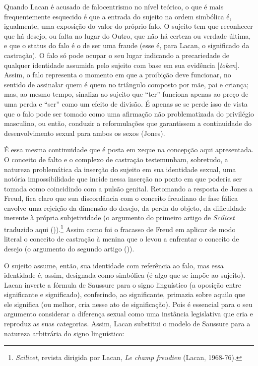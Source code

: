 Quando Lacan é acusado de falocentrismo no nível teórico, o que é mais
frequentemente esquecido é que a entrada do sujeito na ordem simbólica
é, igualmente, uma exposição do valor do próprio falo. O sujeito tem que
reconhecer que há desejo, ou falta no lugar do Outro, que não há certeza
ou verdade última, e que o status do falo é o de ser uma fraude (esse é,
para Lacan, o significado da castração). O falo só pode ocupar o seu
lugar indicando a precariedade de qualquer identidade assumida pelo
sujeito com base em sua evidência {[}\emph{token}{]}. Assim, o falo
representa o momento em que a proibição deve funcionar, no sentido de
assinalar quem é quem no triângulo composto por mãe, pai e criança; mas,
ao mesmo tempo, sinaliza ao sujeito que ``ter'' funciona apenas ao preço
de uma perda e ``ser'' como um efeito de divisão. É apenas se se perde
isso de vista que o falo pode ser tomado como uma afirmação não
problematizada do privilégio masculino, ou então, conduzir a
reformulações que garantissem a continuidade do desenvolvimento sexual
para ambos os sexos (Jones).

É essa mesma continuidade que é posta em xeque na concepção aqui
apresentada. O conceito de falto e o complexo de castração testemunham,
sobretudo, a natureza problemática da inserção do sujeito em sua
identidade sexual, uma notória impossibilidade que incide nessa inserção
no ponto em que poderia ser tomada como coincidindo com a pulsão
genital. Retomando a resposta de Jones a Freud, fica claro que sua
discordância com o conceito freudiano de fase fálica envolve uma
rejeição da dimensão do desejo, da perda do objeto, da dificuldade
inerente à própria subjetividade (o argumento do primeiro artigo de
\emph{Scilicet} traduzido aqui ()).\footnote{\emph{Scilicet}, revista
  dirigida por Lacan, \emph{Le champ freudien} (Lacan, 1968-76).} Assim
como foi o fracasso de Freud em aplicar de modo literal o conceito de
castração à menina que o levou a enfrentar o conceito de desejo (o
argumento do segundo artigo ()).

O sujeito assume, então, sua identidade com referência ao falo, mas essa
identidade é, assim, designada como simbólica (é algo que se impõe ao
sujeito). Lacan inverte a fórmula de Saussure para o signo linguístico
(a oposição entre significante e significado), conferindo, ao
significante, primazia sobre aquilo que ele significa (ou melhor, cria
nesse ato de significação). Pois é essencial para o seu argumento
considerar a diferença sexual como uma instância legislativa que cria e
reproduz as suas categorias. Assim, Lacan substitui o modelo de Saussure
para a natureza arbitrária do signo linguístico:

